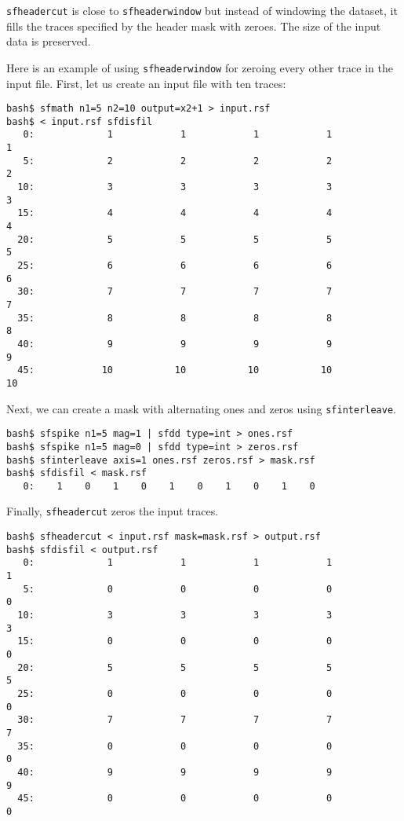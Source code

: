 \noindent\doublebox{\parbox{\textwidth}{
    
  }}

\texttt{sfheadercut} is close to \texttt{sfheaderwindow} but instead
of windowing the dataset, it fills the traces specified by the header
mask with zeroes. The size of the input data is preserved.

Here is an example of using \texttt{sfheaderwindow} for 
zeroing every other trace in the input file. First, let us create
an input file with ten traces:
\begin{verbatim}
bash$ sfmath n1=5 n2=10 output=x2+1 > input.rsf
bash$ < input.rsf sfdisfil
   0:             1            1            1            1            1
   5:             2            2            2            2            2
  10:             3            3            3            3            3
  15:             4            4            4            4            4
  20:             5            5            5            5            5
  25:             6            6            6            6            6
  30:             7            7            7            7            7
  35:             8            8            8            8            8
  40:             9            9            9            9            9
  45:            10           10           10           10           10
\end{verbatim}
Next, we can create a mask with alternating ones and zeros using
\texttt{sfinterleave}.
\begin{verbatim}
bash$ sfspike n1=5 mag=1 | sfdd type=int > ones.rsf
bash$ sfspike n1=5 mag=0 | sfdd type=int > zeros.rsf
bash$ sfinterleave axis=1 ones.rsf zeros.rsf > mask.rsf
bash$ sfdisfil < mask.rsf
   0:    1    0    1    0    1    0    1    0    1    0
\end{verbatim}
Finally, \texttt{sfheadercut} zeros the input traces.
\begin{verbatim}
bash$ sfheadercut < input.rsf mask=mask.rsf > output.rsf
bash$ sfdisfil < output.rsf 
   0:             1            1            1            1            1
   5:             0            0            0            0            0
  10:             3            3            3            3            3
  15:             0            0            0            0            0
  20:             5            5            5            5            5
  25:             0            0            0            0            0
  30:             7            7            7            7            7
  35:             0            0            0            0            0
  40:             9            9            9            9            9
  45:             0            0            0            0            0
\end{verbatim}

